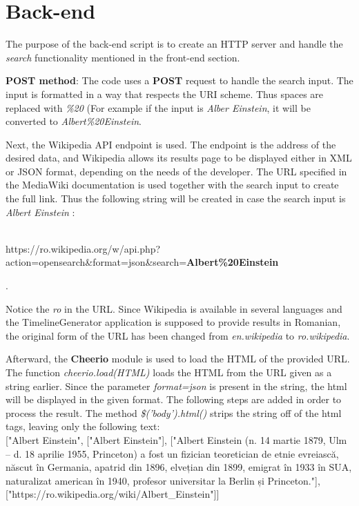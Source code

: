 \documentclass{report}
\begin{document}
\section {Back-end}
The purpose of the back-end script is to create an HTTP server and handle the \textit{search} functionality mentioned in the front-end section.\par

\textbf{POST method}: The code uses a \textbf{POST} request to handle the search input. The input is formatted in a way that respects the URI scheme. Thus spaces are replaced with \textit{\%20} (For example if the input is \textit{Alber Einstein}, it will be converted to \textit{Albert\%20Einstein}. \par

Next, the Wikipedia API endpoint is used. The endpoint is the address of the desired data, and Wikipedia allows its results page to be displayed either in XML or JSON format, depending on the needs of the developer. The URL specified in the MediaWiki documentation is used together with the search input to create the full link. Thus the following string will be created in case the search input is \textit{Albert Einstein} :\\\\\centerline{https://ro.wikipedia.org/w/api.php?action=opensearch\&format=json\&search=\textbf{Albert\%20Einstein}}.\par Notice the \textit{ro} in the URL. Since Wikipedia is available in several languages and the TimelineGenerator application is supposed to provide results in Romanian, the original form of the URL has been changed from \textit{en.wikipedia} to \textit{ro.wikipedia}.

Afterward, the \textbf{Cheerio} module is used to load the HTML of the provided URL. The function \textit{cheerio.load(HTML)} loads the HTML from the URL given as a string earlier. Since the parameter \textit{format=json} is present in the string, the html will be displayed in the given format. The following steps are added in order to process the result. The method \textit{\$('body').html()} strips the string off of the html tags, leaving only the following text:\\

    ["Albert Einstein",
    ["Albert Einstein"],
    ["Albert Einstein (n. 14 martie 1879, Ulm – d. 18 aprilie 1955, Princeton) a fost un fizician teoretician de etnie evreiască, născut în Germania, apatrid din 1896, elvețian din 1899, emigrat în                 1933 în SUA, naturalizat american în 1940, profesor universitar la Berlin și Princeton."],
    ["https://ro.wikipedia.org/wiki/Albert\_Einstein"]]\par
\end{document}
